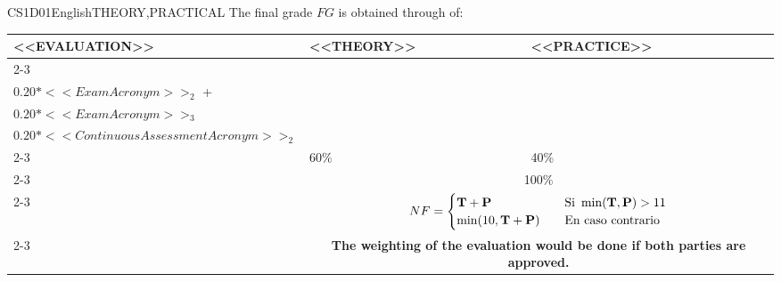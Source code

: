   \begin{evaluation}{CS1D01}{English}{THEORY,PRACTICAL}
    The final grade $FG$ is obtained through of:

    \begin{tabularx}{0.9\textwidth}{|X|p{}|p{}|} \hline
    \multirow{4}{*}{\uppercase{<<Evaluation>>}} & \uppercase{<<Theory>>} & \uppercase{<<Practice>>} \\ \cline{2-3}
    & %
        \begin{minipage}{0.95\textwidth}
        \begin{tabular}{l}
            $\text{\textbf{T}} = 0.20*<<ExamAcronym>>_{1}$  + \\
            $0.20*<<ExamAcronym>>_{2}$  + \\
            $0.20*<<ExamAcronym>>_{3}$  
            \end{tabular}
        \end{minipage}
    & %
        \begin{minipage}{0.95\textwidth}
        \begin{tabular}{l}
            $\text{\textbf{P}} = 0.20*<<ContinuousAssessmentAcronym>>_{1}$ + \\
            $0.20*<<ContinuousAssessmentAcronym>>_{2}$ 
        \end{tabular}
        \end{minipage}                 \\ \cline{2-3}
  
    & %
    60\% 
    & %
    40\% \\ \cline{2-3}
    & \multicolumn{2}{c|}{100\%}  \\ \cline{2-3}
    & \multicolumn{2}{c|}{
      \begin{math}
        NF =
        \begin{cases}
          \text{\textbf{T}} + \text{\textbf{P}}   & \quad \text{Si } \min(\text{\textbf{T}},\text{\textbf{P}}) > 11   \\
          \min(10,\text{\textbf{T}} + \text{\textbf{P}})   & \quad \text{En caso contrario}
        \end{cases}
      \end{math}
    } \\ \cline{2-3}
    & \multicolumn{2}{c|}{\textbf{The weighting of the evaluation would be done if both parties are approved.}}  \\ \hline
    \end{tabularx}
        

\end{evaluation}
